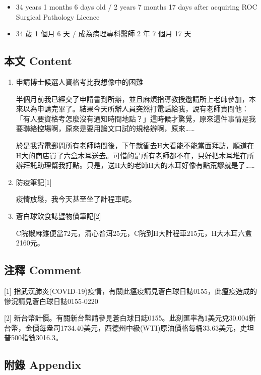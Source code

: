 \documentclass[a5paper, 11pt
]{book}
\providecommand{\tightlist}{%
  \setlength{\itemsep}{0pt}\setlength{\parskip}{0pt}}
\begin{document}
\begin{itemize}
\tightlist
\item
  34 years 1 months 6 days old / 2 years 7 months 17 days after
  acquiring ROC Surgical Pathology Licence
\item
  34 歲 1 個月 6 天 / 成為病理專科醫師 2 年 7 個月 17 天
\end{itemize}

\hypertarget{ux672cux6587-content-89}{%
\subsection{本文 Content}\label{ux672cux6587-content-89}}

\begin{enumerate}
\def\labelenumi{\arabic{enumi}.}
\item
  申請博士候選人資格考比我想像中的困難

  半個月前我已經交了申請書到所辦，並且麻煩指導教授邀請所上老師參加，本來以為申請完畢了。結果今天所辦人員突然打電話給我，說有老師責問他：「有人要資格考怎麼沒有通知時間地點？」這時候才驚覺，原來這件事情是我要聯絡控場啊，原來是要用論文口試的規格辦啊，原來\ldots\ldots{}

  於是我寄電郵問所有老師時間後，下午就衝去H大看能不能當面拜訪，順道在H大的商店買了六盒木耳送去。可惜的是所有老師都不在，只好把木耳堆在所辦拜託助理幫我打點。只是，送H大的老師H大的木耳好像有點荒謬就是了\ldots\ldots{}
\item
  防疫筆記{[}1{]}

  疫情放鬆，我今天甚至坐了計程車呢。
\item
  蒼白球飲食誌暨物價筆記{[}2{]}

  C院椒麻雞便當72元，清心普洱25元，C院到H大計程車215元，H大木耳六盒2160元。
\end{enumerate}

\hypertarget{ux6ce8ux91cb-comment-89}{%
\subsection{注釋 Comment}\label{ux6ce8ux91cb-comment-89}}

{[}1{]}
指武漢肺炎(COVID-19)疫情，有關此瘟疫請見蒼白球日誌0155，此瘟疫造成的慘況請見蒼白球日誌0155-0220

{[}2{]}
新台幣計價。有關新台幣請參見蒼白球日誌0155。此刻匯率為1美元兌30.004新台幣，金價每盎司1734.40美元，西德州中級(WTI)原油價格每桶33.63美元，史坦普500指數3016.3。

\hypertarget{ux9644ux9304-appendix-89}{%
\subsection{附錄 Appendix}\label{ux9644ux9304-appendix-89}}
\end{document}
